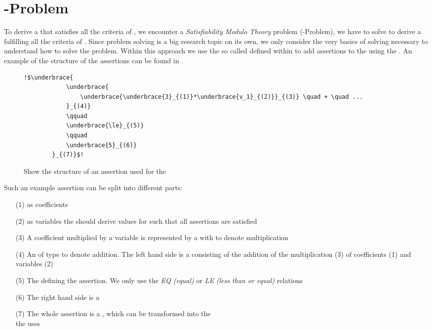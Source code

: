 \section{-Problem}
\label{sec:smt-problem}
To derive a \gna that satisfies all the criteria of , we encounter a \textit{Satisfiability Modulo Theory} problem (-Problem), we have to solve to derive a \gna fulfilling all the criteria of . Since  problem solving is a big research topic on its own, we only consider the very basics of  solving necessary to understand how to solve the problem. \newline
Within this approach we use the so called  defined within \aprove to add assertions to the \solver using the \smtfactory. An example of the structure of the assertions can be found in . %

\begin{figure}[H]
	\begin{lstlisting}[escapechar = !]
		!$\underbrace{
			\underbrace{
				\underbrace{\underbrace{3}_{(1)}*\underbrace{v_1}_{(2)}}_{(3)} \quad + \quad ...
			}_{(4)} 
			\qquad
			\underbrace{\le}_{(5)}
			\qquad
			\underbrace{5}_{(6)}
		}_{(7)}$!
	\end{lstlisting}
	\caption{Show the structure of an assertion used for the \solver}
	\label{ex:assertion-structure}
\end{figure}

Such an example assertion can be split into different parts: 
\begin{enumerate}
	\item[(1)]  as coefficients
	\item[(2)]  as variables the \solver should derive values for such that all assertions are satisfied
	\item[(3)] A coefficient multiplied by a variable is represented by a  with   to denote multiplication
	\item[(4)] An  of type  to denote addition. The left hand side is a  consisting of the addition of the multiplication (3) of coefficients (1) and variables (2)
	\item[(5)] The  defining the assertion. We only use the \textit{EQ (equal)} or \textit{LE (less than or equal)} relations
	\item[(6)] The right hand side is a 
	\item[(7)] The whole assertion is a , which can be transformed into the \\  the \solver uses
\end{enumerate}

